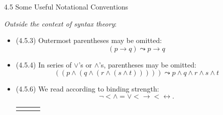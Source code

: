 \documentclass[../slides.tex]{subfiles}
\begin{document}
\begin{frame}{4.5 Some Useful Notational Conventions}

\emph{Outside the context of syntax theory}:

	\begin{itemize}
	
		\item (4.5.3) Outermost parentheses may be omitted: \[(p\to q)\leadsto p\to q\]
		
		\item (4.5.4) In series of $\lor$'s or $\land$'s, parentheses may be omitted:\[((p\land (q\land (r\land (s\land t)))))\leadsto p\land q\land r\land s\land t\]
	
		\item (4.5.6) We read according to binding strength: \[{\neg} <{\land}={\lor}<{\to}<{\leftrightarrow}.\]
		
			\begin{center}
		
		\begin{tabular}{c c c}
		\begin{tikzpicture}
		{\Tree [.$p\land q\to r$ [.$p$ ] [.$q\to r$ [.$q$ ] [.$r$ ] ] ]}
		\end{tikzpicture}

		& 
		
		\qquad \raisebox{7.5ex}{vs.} \qquad 
				\begin{tikzpicture}

		{\Tree [.$p\land q\to r$ [.$p\land q$ [.$p$ ] [.$q$ ] ] [.$r$ ] ]}
		\end{tikzpicture}

		\end{tabular}
		\end{center}
	
	\end{itemize}


\end{frame}
\end{document}
